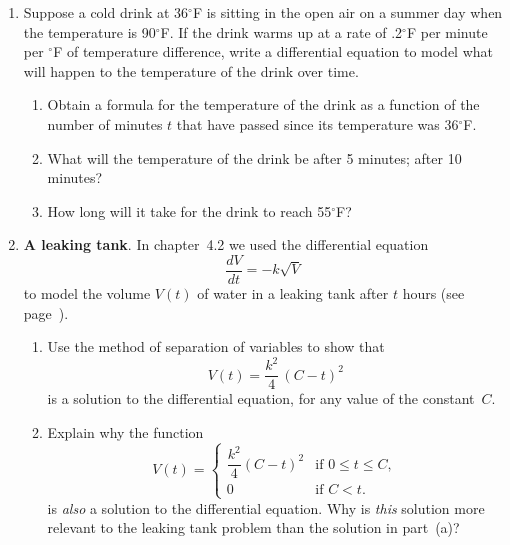 \begin{enumerate}
\begin{enumerate}
  \item Suppose $A$ is 20$^\circ$C and $k$ is .1$^\circ$ per minute per
$^\circ$C.  If time $t$ is measured in minutes, and $Q(0) =
90^\circ$C, what will $Q$ be after 20 minutes?

  \item How long does it take for the temperature to drop to 30$^\circ$C?


\end{enumerate}
\item Suppose a cold drink at 36$^\circ$F is sitting in the open air
on a summer day when the temperature is 90$^\circ$F.  If the drink
warms up at a rate of .2$^\circ$F per minute per $^\circ$F of
temperature difference, write a differential equation to model what
will happen to the temperature of the drink over time.

  \begin{enumerate}
  \item Obtain a formula for the temperature of the drink as a function
of the number of minutes $t$ that have passed since its temperature
was 36$^\circ$F.

  \item What will the temperature of the drink be after 5 minutes; after
10 minutes?

  \item How long will it take for the drink to reach 55$^\circ$F?


\end{enumerate}
\item {\bf A leaking tank}. In chapter~4.2 we used
the differential equation
	\[
\dfrac{dV}{dt} = -k \sqrt{V}
\]
to model the volume $V(t)$ of water in a leaking tank after $t$ hours
(see page~\pageref{leaking tank-begin}).

  \begin{enumerate}
  \item Use the method of separation of variables to show that
	\[
V(t) = \dfrac{k^2}{4} \, (C - t)^2
\]
is a solution to the differential equation, for any value of the
constant~$C$.

  \item Explain why the function
\[
V(t) = \begin{cases}
\dfrac{{k^2}}{4} (C - t)^2 &\text{if $0 \leq t \leq C$}, \\[8pt]
0 &  \text{if $C < t$}.
\end{cases}
\]
is {\em also\/} a solution to the differential equation.  Why is {\em
  this\/} solution more relevant to the leaking tank problem than the
solution in part~(a)?



\end{enumerate}
\end{enumerate}
